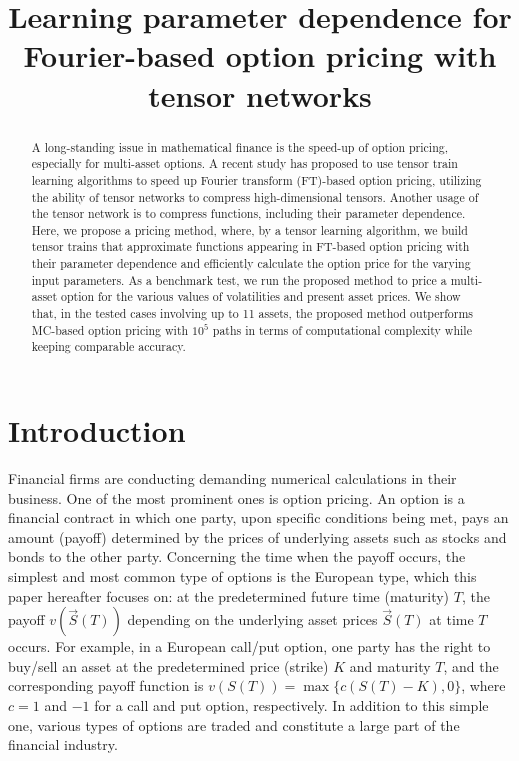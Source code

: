 
\title{Learning parameter dependence for Fourier-based option pricing with tensor networks}
\begin{abstract}
A long-standing issue in mathematical finance is the speed-up of option pricing, especially for multi-asset options. 
A recent study has proposed to use tensor train learning algorithms to speed up Fourier transform (FT)-based option pricing, utilizing the ability of tensor networks to compress high-dimensional tensors. 
Another usage of the tensor network is to compress functions, including their parameter dependence. 
Here, we propose a pricing method, where, by a tensor learning algorithm, we build tensor trains that approximate functions appearing in FT-based option pricing with their parameter dependence and efficiently calculate the option price for the varying input parameters.
As a benchmark test, we run the proposed method to price a multi-asset option for the various values of volatilities and present asset prices.
We show that, in the tested cases involving up to 11 assets, the proposed method outperforms MC-based option pricing with $10^5$ paths in terms of computational complexity while keeping comparable accuracy.

\end{abstract}
\maketitle

\section{Introduction}
Financial firms are conducting demanding numerical calculations in their business.
One of the most prominent ones is option pricing.
An option is a financial contract in which one party, upon specific conditions being met, pays an amount (payoff) determined by the prices of underlying assets such as stocks and bonds to the other party.
Concerning the time when the payoff occurs, the simplest and most common type of options is the European type, which this paper hereafter focuses on: at the predetermined future time (maturity) $T$, the payoff $v(\vec{S}(T))$ depending on the underlying asset prices $\vec{S}(T)$ at time $T$ occurs.
For example, in a European call/put option, one party has the right to buy/sell an asset at the predetermined price (strike) $K$ and maturity $T$, and the corresponding payoff function is $v(S(T))=\max\{c(S(T)-K),0\}$, where $c=1$ and $-1$ for a call and put option, respectively.
In addition to this simple one, various types of options are traded and constitute a large part of the financial industry.

